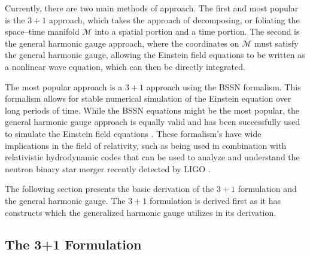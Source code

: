\documentclass[11pt]{article}
\numberwithin{equation}{section}
\begin{document}
Currently, there are two main methods of approach. The first and most popular is the $3+1$ approach, which takes the approach of decomposing, or foliating the space--time manifold $\mathcal{M}$ into a spatial portion and a time portion. The second is the general harmonic gauge approach, where the coordinates on $\mathcal{M}$ must satisfy the general harmonic gauge, allowing the Einstein field equations to be written as a nonlinear wave equation, which can then be directly integrated. 

The most popular approach is a $3+1$ approach using the BSSN formalism. This formalism allows for stable numerical simulation of the Einstein equation over long periods of time. While the BSSN equations might be the most popular, the general harmonic gauge approach is equally valid and has been successfully used to simulate the Einstein field equations \cite{2005CQGra..22..425P}. These formalism's have wide implications in the field of relativity, such as being used in combination with relativistic hydrodynamic codes that can be used to analyze and understand the neutron binary star merger recently detected by LIGO \cite{2041-8205-848-2-L13}.

The following section presents the basic derivation of the $3+1$ formulation and the general harmonic gauge. The $3+1$ formulation is derived first as it has constructs which the generalized harmonic gauge utilizes in its derivation. 

\subsection{The 3+1 Formulation}
\end{document}
